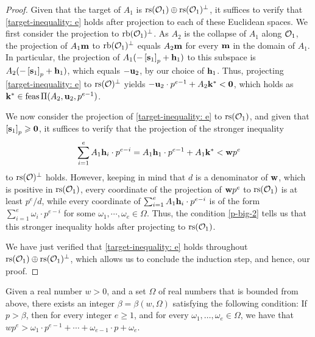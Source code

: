 \documentclass[11pt]{amsart}
\newcommand{\denom}{d} %
\begin{document}
\begin{proof}
Given that the target of $A_1$ is $\operatorname{rs}(\mathcal{O}_1) \oplus \operatorname{rs}(\mathcal{O}_1)^{\perp}$, it suffices to verify that \eqref{target-inequality: e} holds after projection to each of these Euclidean spaces.  We first consider the projection to $\operatorname{rb}(\mathcal{O}_1)^{\perp}$.  As $A_2$ is the collapse of $A_1$ along $\mathcal{O}_1$, the projection of $A_1 \mathbf{m}$ to $\operatorname{rb}(\mathcal{O}_1)^{\perp}$ equals $A_2 \mathbf{m}$ for every $\mathbf{m}$ in the domain of $A_1$.  In particular, the projection of $A_1( - \left[ \mathbf{s}_1 \right]_p + \mathbf{h}_1 )$ to this subspace is $A_2 ( - \left[ \mathbf{s}_1 \right]_p + \mathbf{h}_1 )$, which equals $-\mathbf{u}_2$, by our choice of $\mathbf{h}_1$.  Thus, projecting \eqref{target-inequality: e} to $\operatorname{rs}(\mathcal{O})^{\perp}$ yields $-\mathbf{u}_2 \cdot p^{e-1} + A_2 \mathbf{k}^{\ast} < \mathbf{0}$, which holds as $\mathbf{k}^{\ast} \in \operatorname{feas} \Pi(A_2, \mathbf{u}_2, p^{e-1})$.

We now consider the projection of \eqref{target-inequality: e} to $\operatorname{rs}(\mathcal{O}_1)$, and given that $\left[ \mathbf{s}_1 \right]_p \geqslant \mathbf{0}$, it suffices to verify that the projection of the stronger inequality \[ \sum_{i=1}^{e} A_1 \mathbf{h}_i \cdot p^{e-i} = A_1 \mathbf{h}_1 \cdot p^{e-1} + A_1 \mathbf{k}^{\ast} < \mathbf{w}p^e \] to $\operatorname{rs}(\mathcal{O})^{\perp}$ holds.  However, keeping in mind that $\denom$ is a denominator of $\mathbf{w}$, which is positive in $\operatorname{rs}(\mathcal{O}_1)$, every coordinate of the projection of $\mathbf{w} p^e$ to $\operatorname{rs}(\mathcal{O}_1)$ is at least $p^e / \denom$, while every coordinate of $\sum_{i=1}^{e} A_1 \mathbf{h}_i \cdot p^{e-i}$ is of the form $\sum_{i=1}^{e} \omega_i \cdot p^{e-i}$ for some $\omega_1, \cdots, \omega_e \in \Omega$.  Thus, the condition \eqref{p-big-2} tells us that this stronger inequality holds after projecting to $\operatorname{rs}(\mathcal{O}_1)$.

We have just verified that \eqref{target-inequality: e} holds throughout $\operatorname{rs}(\mathcal{O}_1) \oplus \operatorname{rs}(\mathcal{O}_1)^{\perp}$, which allows us to conclude the induction step, and hence, our proof.
\end{proof}

\begin{lemma}
   \label{positive-polynomial: L}
   Given a real number $w > 0$, and a set $\Omega$ of real numbers that is bounded from above, there exists an integer $\beta = \beta(w, \Omega)$ satisfying the following condition\textup:
   If $p > \beta$, then for every integer $e \geq 1$, and for every $\omega_1, \ldots, \omega_e \in \Omega$, we have that $wp^{e} >  \omega_1 \cdot p^{e-1} + \cdots + \omega_{e-1} \cdot p + \omega_e$.
\end{lemma}
\end{document}
